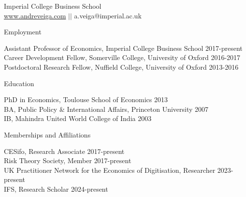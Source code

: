 \documentclass{resume}
\begin{document}
\begin{center}
\vspace{-2em}
Imperial College Business School  \\ 
\href{http://www.andreveiga.com}{www.andreveiga.com} 
\quad $||$ \quad 
a.veiga@imperial.ac.uk 
\vspace{0.5em}
\end{center}




\begin{rSection}{Employment}

Assistant Professor of Economics, Imperial College Business School \hfill {2017-present} 
\\ Career Development Fellow, Somerville College, University of Oxford \hfill {2016-2017} 
\\ Postdoctoral Research Fellow, Nuffield College, University of Oxford \hfill {2013-2016} 	
	
\end{rSection}











\begin{rSection}{Education}

PhD in Economics, Toulouse School of Economics \hfill {2013} 
\\ BA, Public Policy \& International Affairs, Princeton University \hfill {2007}
\\ IB, Mahindra United World College of India \hfill{2003}

\end{rSection}








\begin{rSection}{Memberships and Affiliations}

CESifo, Research Associate \hfill {2017-present} \\ 
Risk Theory Society, Member \hfill {2017-present} \\ 
UK Practitioner Network for the Economics of Digitisation, Researcher \hfill {2023-present} \\ 
IFS, Research Scholar \hfill {2024-present}
	
\end{rSection}
\end{document}
